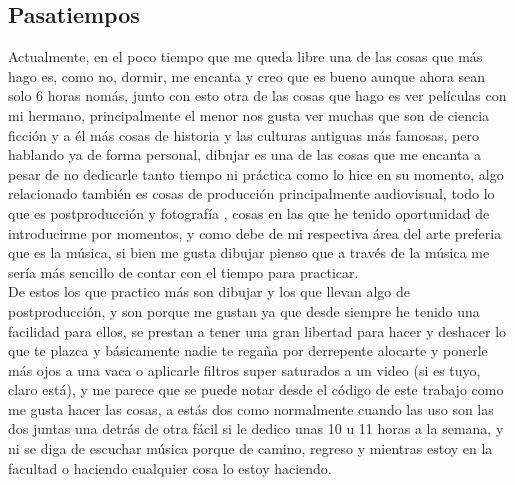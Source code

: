\documentclass[letterpaper, 12pt]{article}
\begin{document}
    \subsection*{Pasatiempos}
    
    Actualmente, en el poco tiempo que me queda libre una de las cosas que más hago es, como no, dormir, me encanta y creo que es bueno aunque ahora sean solo 6 horas nomás, junto con esto otra de las cosas que hago es ver películas con mi hermano, principalmente el menor %
    nos gusta ver muchas que son de ciencia ficción y a él más cosas de historia y las culturas antiguas más famosas, %
    pero hablando ya de forma personal, dibujar es una de las cosas que me encanta %
    a pesar de no dedicarle tanto tiempo ni práctica como lo hice en su momento, algo relacionado también es cosas de producción principalmente audiovisual, todo lo que es postproducción y fotografía%
    , cosas en las que he tenido oportunidad de introducirme por momentos, y como debe de mi respectiva área del arte preferia que es la música, si bien me gusta dibujar pienso que a través de la música me sería más sencillo de contar con el tiempo para practicar.\\%
    
    
    De estos los que practico más son dibujar y los que llevan algo de postproducción, y son porque me gustan ya que desde siempre he tenido una facilidad para ellos, se prestan a tener una gran libertad para hacer y deshacer lo que te plazca y básicamente nadie te regaña por derrepente alocarte y ponerle más ojos a una vaca o aplicarle filtros super saturados a un video (si es tuyo, claro está), y me parece que se puede notar desde el código de este trabajo como me gusta hacer las cosas, a estás dos como normalmente cuando las uso son las dos juntas una detrás de otra fácil si le dedico unas 10 u 11 horas a la semana, y ni se diga de escuchar música porque de camino, regreso y mientras estoy en la facultad o haciendo cualquier cosa lo estoy haciendo.
    
\end{document}
